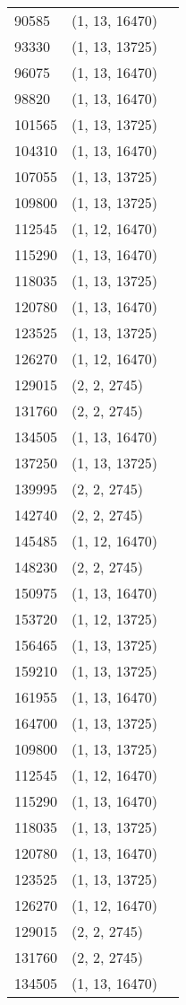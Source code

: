 \begin{longtable}{|l|l|l|}
		90585 & (1, 13, 16470) \\
		93330 & (1, 13, 13725) \\
		96075 & (1, 13, 16470) \\
		98820 & (1, 13, 16470) \\
		101565 & (1, 13, 13725) \\
		104310 & (1, 13, 16470) \\
		107055 & (1, 13, 13725) \\
		109800 & (1, 13, 13725) \\
		112545 & (1, 12, 16470)  \\
		115290 & (1, 13, 16470) \\
		118035 & (1, 13, 13725) \\
		120780 & (1, 13, 16470) \\
		123525 & (1, 13, 13725) \\
		126270 & (1, 12, 16470) \\
		129015 & (2, 2, 2745) \\
		131760 & (2, 2, 2745)  \\
		134505 & (1, 13, 16470) \\
		137250 & (1, 13, 13725)\\
		139995 & (2, 2, 2745)  \\
		142740 & (2, 2, 2745)  \\
		145485 & (1, 12, 16470) \\
		148230 & (2, 2, 2745)  \\
		150975 & (1, 13, 16470)  \\
		153720 & (1, 12, 13725) \\
		156465 & (1, 13, 13725)  \\
		159210 & (1, 13, 13725)  \\
		161955 & (1, 13, 16470)  \\
		164700 & (1, 13, 13725) \\
		109800 & (1, 13, 13725) \\
		112545 & (1, 12, 16470)  \\
		115290 & (1, 13, 16470) \\
		118035 & (1, 13, 13725) \\
		120780 & (1, 13, 16470) \\
		123525 & (1, 13, 13725) \\
		126270 & (1, 12, 16470) \\
		129015 & (2, 2, 2745) \\
		131760 & (2, 2, 2745)  \\
		134505 & (1, 13, 16470) \\

\end{longtable}
